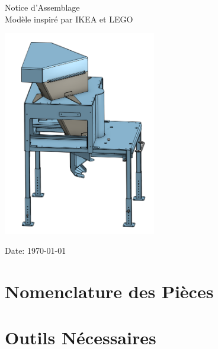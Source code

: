 \documentclass[a5paper,portrait]{article}
\begin{document}
\begin{titlepage}
    \hfill
        \centering
        \vspace*{2cm}
        {\color{mainblue}\sffamily\Huge Notice d'Assemblage}\\[1cm]
        {\color{accent}\sffamily\Large Modèle inspiré par IKEA et LEGO}\\[1.5cm]
        \begin{center}
            \includegraphics[width=0.5\textwidth]{../images/general_vue.png}
        \end{center}
        \vfill
        {\color{mainblue}\large Date: \today}
\end{titlepage}

\newpage



\newpage

\section*{Nomenclature des Pièces}

\section*{Outils Nécessaires}


\newpage



\newpage



\newpage
\end{document}
